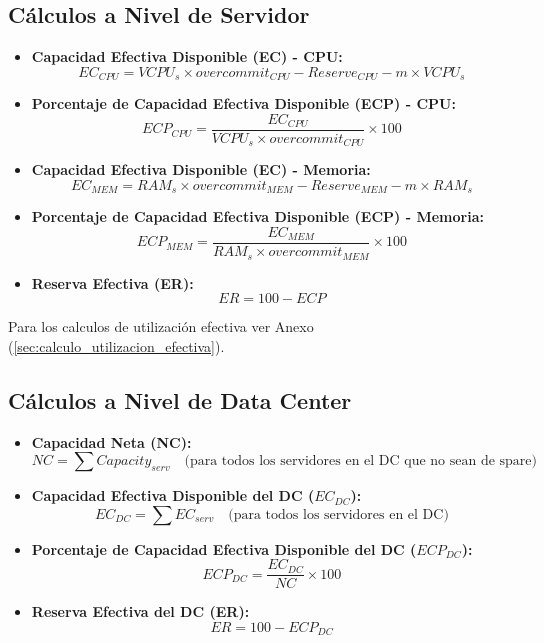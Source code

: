 \documentclass[11pt,a4paper]{article}
\begin{document}
\subsection{Cálculos a Nivel de Servidor}
\begin{itemize}
    \item \textbf{Capacidad Efectiva Disponible (EC) - CPU:}
    $$ EC_{CPU} = VCPU_s \times overcommit_{CPU} - Reserve_{CPU} - m \times VCPU_s $$
    
    \item \textbf{Porcentaje de Capacidad Efectiva Disponible (ECP) - CPU:}
    $$ ECP_{CPU} = \frac{EC_{CPU}}{VCPU_s \times overcommit_{CPU}} \times 100 $$

    \item \textbf{Capacidad Efectiva Disponible (EC) - Memoria:}
    $$ EC_{MEM} = RAM_s \times overcommit_{MEM} - Reserve_{MEM} - m \times RAM_s $$
    
    \item \textbf{Porcentaje de Capacidad Efectiva Disponible (ECP) - Memoria:}
    $$ ECP_{MEM} = \frac{EC_{MEM}}{RAM_s \times overcommit_{MEM}} \times 100 $$
    
    \item \textbf{Reserva Efectiva (ER):}
    $$ ER = 100 - ECP $$
\end{itemize}

Para los calculos de utilización efectiva ver Anexo (\ref{sec:calculo_utilizacion_efectiva}).

\subsection{Cálculos a Nivel de Data Center}
\begin{itemize}
    \item \textbf{Capacidad Neta (NC):}
    $$ NC = \sum Capacity_{serv} \quad \text{(para todos los servidores en el DC que no sean de spare)} $$
    
    \item \textbf{Capacidad Efectiva Disponible del DC ($EC_{DC}$):}
    $$ EC_{DC} = \sum EC_{serv} \quad \text{(para todos los servidores en el DC)} $$
    
    \item \textbf{Porcentaje de Capacidad Efectiva Disponible del DC ($ECP_{DC}$):}
    $$ ECP_{DC} = \frac{EC_{DC}}{NC} \times 100 $$
    
    \item \textbf{Reserva Efectiva del DC (ER):}
    $$ ER = 100 - ECP_{DC} $$
\end{itemize}
\end{document}

